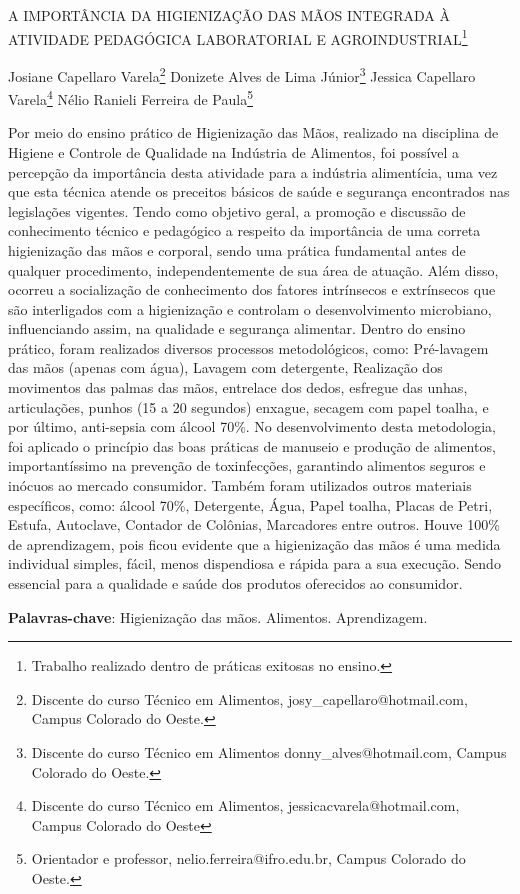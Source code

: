 \documentclass[article,12pt,onesidea,4paper,english,brazil]{abntex2}
\begin{document}
	
	
	\frenchspacing 
	
	\begin{center}
		\LARGE A IMPORTÂNCIA DA HIGIENIZAÇÃO DAS MÃOS INTEGRADA À ATIVIDADE
		PEDAGÓGICA LABORATORIAL E AGROINDUSTRIAL\footnote{Trabalho realizado dentro de práticas exitosas no ensino.}
		
		\normalsize
	Josiane Capellaro Varela\footnote{Discente do curso Técnico em Alimentos, josy\_capellaro@hotmail.com, Campus Colorado do Oeste.} 
		Donizete Alves de Lima Júnior\footnote{Discente do curso Técnico em Alimentos donny\_alves@hotmail.com, Campus Colorado do Oeste.} 
	Jessica Capellaro Varela\footnote{Discente do curso Técnico em Alimentos, jessicacvarela@hotmail.com, Campus Colorado do Oeste} 
	Nélio Ranieli Ferreira de Paula\footnote{Orientador e professor, nelio.ferreira@ifro.edu.br, Campus Colorado do Oeste.} 
	\end{center}
	
	\noindent Por meio do ensino prático de Higienização das Mãos, realizado na disciplina de
	Higiene e Controle de Qualidade na Indústria de Alimentos, foi possível a percepção
	da importância desta atividade para a indústria alimentícia, uma vez que esta técnica
	atende os preceitos básicos de saúde e segurança encontrados nas legislações
	vigentes. Tendo como objetivo geral, a promoção e discussão de conhecimento
	técnico e pedagógico a respeito da importância de uma correta higienização das
	mãos e corporal, sendo uma prática fundamental antes de qualquer procedimento,
	independentemente de sua área de atuação. Além disso, ocorreu a socialização de
	conhecimento dos fatores intrínsecos e extrínsecos que são interligados com a
	higienização e controlam o desenvolvimento microbiano, influenciando assim, na
	qualidade e segurança alimentar. Dentro do ensino prático, foram realizados
	diversos processos metodológicos, como: Pré-lavagem das mãos (apenas com
	água), Lavagem com detergente, Realização dos movimentos das palmas das
	mãos, entrelace dos dedos, esfregue das unhas, articulações, punhos (15 a 20
	segundos) enxague, secagem com papel toalha, e por último, anti-sepsia com álcool
	70\%. No desenvolvimento desta metodologia, foi aplicado o princípio das boas
	práticas de manuseio e produção de alimentos, importantíssimo na prevenção de
	toxinfecções, garantindo alimentos seguros e inócuos ao mercado consumidor.
	Também foram utilizados outros materiais específicos, como: álcool 70\%,
	Detergente, Água, Papel toalha, Placas de Petri, Estufa, Autoclave, Contador de
	Colônias, Marcadores entre outros. Houve 100\% de aprendizagem, pois ficou
	evidente que a higienização das mãos é uma medida individual simples, fácil, menos
	dispendiosa e rápida para a sua execução. Sendo essencial para a qualidade e
	saúde dos produtos oferecidos ao consumidor.
	
	\vspace{\onelineskip}
	
	\noindent
	\textbf{Palavras-chave}: Higienização das mãos. Alimentos. Aprendizagem.
	
\end{document}

